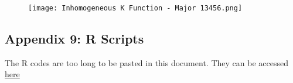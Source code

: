 \documentclass[a4paper]{thesis}
\begin{document}
\begin{figure}[H]
\begin{center}
\texttt{[image: Inhomogeneous K Function - Major 13456.png]}
\end{center}
\end{figure}

\subsection{Appendix 9: R Scripts}

The R codes are too long to be pasted in this document. They can be accessed \href{https://github.com/donkalonga/MSc-Project-spatio-temporal-modelling}{here}
\end{document}
